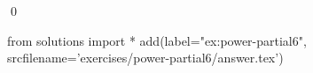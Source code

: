 
\begin{ex} 
  \label{ex:power-partial6}
  
  \qed
\end{ex} 
\begin{python0}
from solutions import *
add(label="ex:power-partial6",
    srcfilename='exercises/power-partial6/answer.tex') 
\end{python0}
